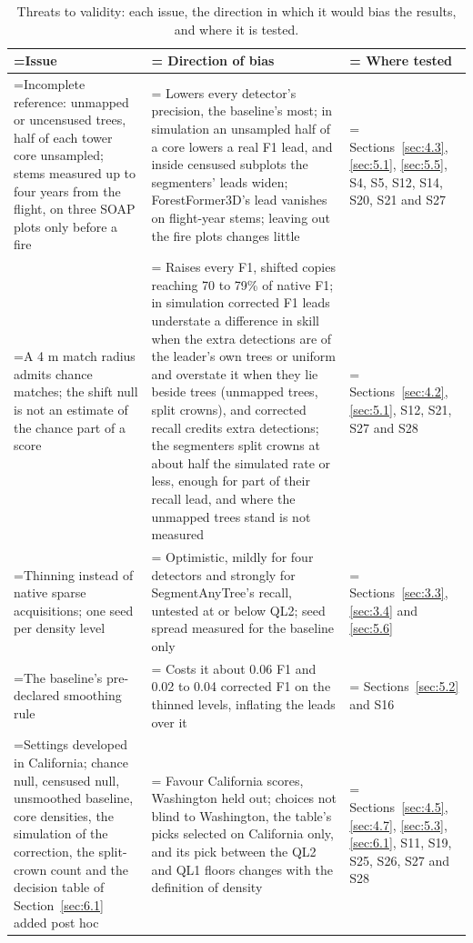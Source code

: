 \documentclass[journal]{IEEEtran}
\begin{document}
\begin{table}[!tp]
\caption{Threats to validity: each issue, the direction in which it would
bias the results, and where it is tested.}
\label{tab:7}
\centering
\footnotesize
\setlength{\tabcolsep}{3pt}
\renewcommand{\arraystretch}{1.15}
\begin{tabularx}{\textwidth}{>{\hsize\linewidth=\hsize}L>{\hsize\linewidth=\hsize}L>{\hsize\linewidth=\hsize}L}
\hline
Issue & Direction of bias & Where tested \\
\hline
Incomplete reference: unmapped or uncensused trees, half of each tower core unsampled; stems measured up to four years from the flight, on three SOAP plots only before a fire & Lowers every detector's precision, the baseline's most; in simulation an unsampled half of a core lowers a real F1 lead, and inside censused subplots the segmenters' leads widen; ForestFormer3D's lead vanishes on flight-year stems; leaving out the fire plots changes little & Sections~\ref{sec:4.3}, \ref{sec:5.1}, \ref{sec:5.5}, S4, S5, S12, S14, S20, S21 and S27 \\
A 4 m match radius admits chance matches; the shift null is not an estimate of the chance part of a score & Raises every F1, shifted copies reaching 70 to 79\% of native F1; in simulation corrected F1 leads understate a difference in skill when the extra detections are of the leader's own trees or uniform and overstate it when they lie beside trees (unmapped trees, split crowns), and corrected recall credits extra detections; the segmenters split crowns at about half the simulated rate or less, enough for part of their recall lead, and where the unmapped trees stand is not measured & Sections~\ref{sec:4.2}, \ref{sec:5.1}, S12, S21, S27 and S28 \\
Thinning instead of native sparse acquisitions; one seed per density level & Optimistic, mildly for four detectors and strongly for SegmentAnyTree's recall, untested at or below QL2; seed spread measured for the baseline only & Sections~\ref{sec:3.3}, \ref{sec:3.4} and \ref{sec:5.6} \\
The baseline's pre-declared smoothing rule & Costs it about 0.06 F1 and 0.02 to 0.04 corrected F1 on the thinned levels, inflating the leads over it & Sections~\ref{sec:5.2} and S16 \\
Settings developed in California; chance null, censused null, unsmoothed baseline, core densities, the simulation of the correction, the split-crown count and the decision table of Section~\ref{sec:6.1} added post hoc & Favour California scores, Washington held out; choices not blind to Washington, the table's picks selected on California only, and its pick between the QL2 and QL1 floors changes with the definition of density & Sections~\ref{sec:4.5}, \ref{sec:4.7}, \ref{sec:5.3}, \ref{sec:6.1}, S11, S19, S25, S26, S27 and S28 \\

\end{tabularx}
\end{table}
\end{document}
